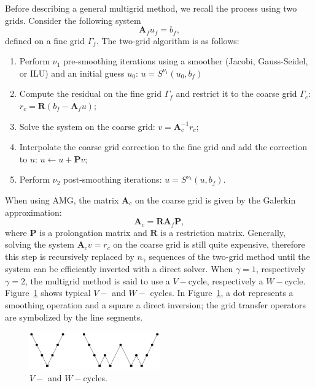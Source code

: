 \documentclass[preprint,10pt]{elsarticle}
\newcommand\bs{\boldsymbol}
\renewcommand{\(}{\left(}
\renewcommand{\)}{\right)}
\renewcommand{\[}{\left[}
\renewcommand{\]}{\right]}
\begin{document}
Before describing a general multigrid method, we recall the process using 
two grids. Consider the following system
\begin{equation}
  \bs{A}_f u_f = b_f,
\end{equation}
defined on a fine grid $\Gamma_f$. The two-grid algorithm is as follows:
\begin{enumerate}
  \item Perform $\nu_1$ pre-smoothing iterations using a smoother (Jacobi,
    Gauss-Seidel, or ILU) and an initial guess $u_0$: $u = S^{\nu_1}(u_0,b_f)$
  \item Compute the residual on the fine grid $\Gamma_f$ and restrict it to
    the coarse grid $\Gamma_c$: $r_c = \bs{R}(b_f-\bs{A}_f u)$;
  \item Solve the system on the coarse grid: $v=\bs{A}_c^{-1} r_c$;
  \item Interpolate the coarse grid correction to the fine grid and add the
    correction to $u$: $u \leftarrow u+\bs{P}v$;
  \item Perform $\nu_2$ post-smoothing iterations: $u = S^{\nu_2}(u,b_f)$.
\end{enumerate}
When using AMG, the matrix $\bs{A}_c$ on the coarse grid is given by the
Galerkin approximation:
\begin{equation}
  \bs{A}_c = \bs{R} \bs{A}_f \bs{P},
\end{equation}
where $\bs{P}$ is a prolongation matrix and $\bs{R}$ is a restriction matrix. 
Generally, solving the system $\bs{A}_c v = r_c$ on the coarse grid is still
quite expensive, therefore this step is recursively replaced by $n_{\gamma}$
sequences of the two-grid method until the system can be efficiently inverted 
with a direct solver.
When $\gamma = 1$, respectively $\gamma =
2$, the multigrid method is said to use a $V-$cycle, respectively a $W-$cycle. 
Figure~\ref {fig_v_w} shows typical $V-$ and $W-$ cycles. In Figure~\ref {fig_v_w}, a 
dot represents a smoothing operation and a square a
direct inversion; the grid transfer operators are symbolized by the line segments.
\begin{figure}[H]
  \centering
  \includegraphics[width=0.5\textwidth]{v_w_cycles}
  \caption{$V-$ and $W-$cycles.}
  \label{fig_v_w}
\end{figure}
\end{document}
